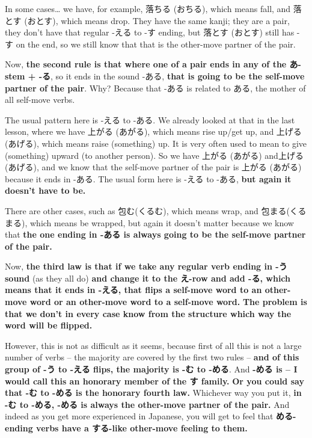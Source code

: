 {}

In some cases\ldots{} we have, for example, 落ちる (おちる), which means fall, and 落とす (おとす), which means drop. They have the same kanji; they are a pair, they don't have that regular -える to -す ending, but 落とす (おとす) still has -す on the end, so we still know that that is the other-move partner of the pair.

\stopsectionlevel

\startsectionlevel[title={ある Family Rule},reference={ある-family-rule}]

Now, {\bf the second rule is that where one of a pair ends in any of the あ-stem + -る}, so it ends in the sound -ある, {\bf that is going to be the self-move partner of the pair}. Why? Because that -ある is related to ある, the mother of all self-move verbs.

{}

The usual pattern here is -える to -ある. We already looked at that in the last lesson, where we have 上がる (あがる), which means rise up/get up, and 上げる (あげる), which means raise (something) up. It is very often used to mean to give (something) upward (to another person). So we have 上がる (あがる) and上げる(あげる), and we know that the self-move partner of the pair is 上がる (あがる) because it ends in -ある. The usual form here is -える to -ある, {\bf but again it doesn't have to be.}

{}

There are other cases, such as 包む(くるむ), which means wrap, and 包まる(くるまる), which means be wrapped, but again it doesn't matter because we know that {\bf the one ending in -ある is always going to be the self-move partner of the pair.}

\stopsectionlevel

\startsectionlevel[title={Switch Rule},reference={switch-rule}]

Now, {\bf the third law is that if we take any regular verb ending in -う sound} (as they all do) {\bf and change it to the え-row and add -る, which means that it ends in -える, that flips a self-move word to an other-move word or an other-move word to a self-move word.} {\bf The problem is that we don't in every case know from the structure which way the word will be flipped.}

{}

However, this is not as difficult as it seems, because first of all this is not a large number of verbs -- the majority are covered by the first two rules -- {\bf and of this group of -う to -える flips, the majority is -む to -める}. And {\bf -める is -- I would call this an honorary member of the す family.} {\bf Or you could say that -む to -める is the honorary fourth law.} Whichever way you put it, {\bf in -む to -める, -める is always the other-move partner of the pair.} And indeed as you get more experienced in Japanese, you will get to feel that {\bf める-ending verbs have a する-like other-move feeling to them.}

